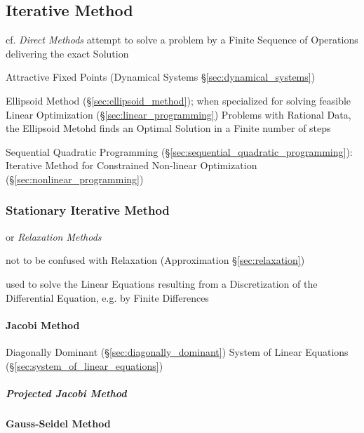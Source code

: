 \subsection{Iterative Method}\label{sec:iterative_method}


cf. \emph{Direct Methods} attempt to solve a problem by a Finite Sequence of
Operations delivering the exact Solution

Attractive Fixed Points (Dynamical Systems \S\ref{sec:dynamical_systems})

\fist Ellipsoid Method (\S\ref{sec:ellipsoid_method}); when specialized for
solving feasible Linear Optimization (\S\ref{sec:linear_programming}) Problems
with Rational Data, the Ellipsoid Metohd finds an Optimal Solution in a Finite
number of steps

\fist Sequential Quadratic Programming
(\S\ref{sec:sequential_quadratic_programming}): Iterative Method for
Constrained Non-linear Optimization (\S\ref{sec:nonlinear_programming})



\subsubsection{Stationary Iterative Method}
\label{sec:stationary_iterative}

or \emph{Relaxation Methods}

\fist not to be confused with Relaxation (Approximation \S\ref{sec:relaxation})

used to solve the Linear Equations resulting from a Discretization of the
Differential Equation, e.g. by Finite Differences



\paragraph{Jacobi Method}\label{sec:jacobi_method}\hfill

Diagonally Dominant (\S\ref{sec:diagonally_dominant}) System of Linear
Equations (\S\ref{sec:system_of_linear_equations})



\subparagraph{Projected Jacobi Method}
\label{sec:projected_jacobi_method}



\paragraph{Gauss-Seidel Method}\label{sec:gauss_seidel}\hfill

